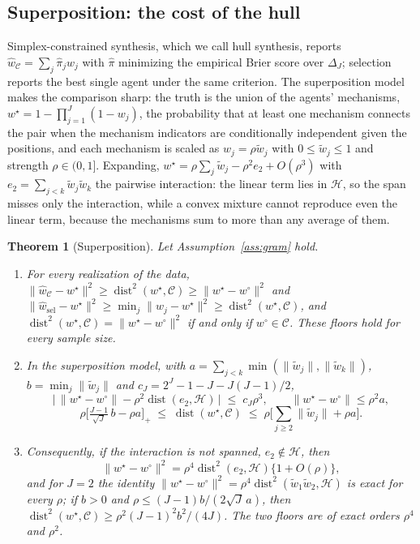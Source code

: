 \documentclass[12pt]{article}
\newtheorem{theorem}{Theorem}
\newcommand{\calH}{\mathcal{H}}
\newcommand{\calC}{\mathcal{C}}
\newcommand{\dist}{\operatorname{dist}}
\newcommand{\norm}[1]{\|#1\|}
\newcommand{\wstar}{w^{\star}}
\newcommand{\wproj}{w^{\circ}}
\newcommand{\what}{\hat w}
\begin{document}
\subsection{Superposition: the cost of the hull}
\label{sec:hull}

Simplex-constrained synthesis, which we call hull synthesis, reports $\what_{\calC}=\sum_j\hat\pi_jw_j$ with $\hat\pi$ minimizing the empirical Brier score over $\Delta_J$; selection reports the best single agent under the same criterion. The superposition model makes the comparison sharp: the truth is the union of the agents' mechanisms, $\wstar=1-\prod_{j=1}^{J}(1-w_j)$, the probability that at least one mechanism connects the pair when the mechanism indicators are conditionally independent given the positions, and each mechanism is scaled as $w_j=\rho\tilde w_j$ with $0\le\tilde w_j\le1$ and strength $\rho\in(0,1]$. Expanding, $\wstar=\rho\sum_j\tilde w_j-\rho^2 e_2+O(\rho^3)$ with $e_2=\sum_{j<k}\tilde w_j\tilde w_k$ the pairwise interaction: the linear term lies in $\calH$, so the span misses only the interaction, while a convex mixture cannot reproduce even the linear term, because the mechanisms sum to more than any average of them.

\begin{theorem}[Superposition]
\label{thm:superposition}
Let Assumption~\ref{ass:gram} hold.
\begin{enumerate}
\item[(i)] For every realization of the data, $\norm{\what_{\calC}-\wstar}^2\ge\dist^2(\wstar,\calC)\ge\norm{\wstar-\wproj}^2$ and $\norm{\what_{\mathrm{sel}}-\wstar}^2\ge\min_j\norm{w_j-\wstar}^2\ge\dist^2(\wstar,\calC)$, and $\dist^2(\wstar,\calC)=\norm{\wstar-\wproj}^2$ if and only if $\wproj\in\calC$. These floors hold for every sample size.
\item[(ii)] In the superposition model, with $a=\sum_{j<k}\min(\norm{\tilde w_j},\norm{\tilde w_k})$, $b=\min_j\norm{\tilde w_j}$ and $c_J=2^J-1-J-J(J-1)/2$,
\[
\big|\,\norm{\wstar-\wproj}-\rho^2\dist(e_2,\calH)\,\big|\;\le\;c_J\rho^3,\qquad \norm{\wstar-\wproj}\le\rho^2a,
\]
\[
\rho\Big[\tfrac{J-1}{\sqrt J}\,b-\rho a\Big]_{+}\;\le\;\dist(\wstar,\calC)\;\le\;\rho\Big[\sum_{j\ge2}\norm{\tilde w_j}+\rho a\Big].
\]
\item[(iii)] Consequently, if the interaction is not spanned, $e_2\notin\calH$, then
\[
\norm{\wstar-\wproj}^2=\rho^4\dist^2(e_2,\calH)\{1+O(\rho)\},
\]
and for $J=2$ the identity $\norm{\wstar-\wproj}^2=\rho^4\dist^2(\tilde w_1\tilde w_2,\calH)$ is exact for every $\rho$; if $b>0$ and $\rho\le(J-1)b/(2\sqrt J\,a)$, then $\dist^2(\wstar,\calC)\ge\rho^2(J-1)^2b^2/(4J)$. The two floors are of exact orders $\rho^4$ and $\rho^2$.
\end{enumerate}
\end{theorem}
\end{document}
